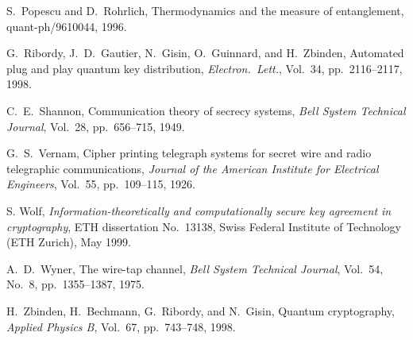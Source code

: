 \documentclass{article}
\begin{document}
\begin{thebibliography}{10}
S.~Popescu and D.\ Rohrlich, Thermodynamics and the measure of 
entanglement,  quant-ph/9610044, 1996.

 G.\ Ribordy,
J.~D.~Gautier, N.~Gisin, O.~Guinnard, and H.~Zbinden, Automated plug and play quantum 
key distribution,  {\em Electron.\ Lett.},
Vol.~34, pp.~2116--2117, 1998.

C.~E.~Shannon, Communication theory of secrecy systems,
{\em Bell System Technical Journal}, Vol.~28, pp.~656--715, 1949.

G.~S.~Vernam, Cipher printing telegraph systems for secret wire and 
radio telegraphic communications, {\em Journal of the American
Institute for Electrical Engineers}, Vol.~55, pp.~109--115, 1926.


 S. Wolf, {\em Information-theoretically and computationally
secure key agreement in cryptography}, ETH dissertation No.\ 13138, 
Swiss Federal Institute of Technology (ETH Zurich), May 1999.


A.~D.~Wyner, The wire-tap channel,
{\em Bell System Technical Journal}, Vol.~54, No.~8, pp.~1355--1387, 1975.

 H.~Zbinden, H.~Bechmann, G.~Ribordy, and N.~Gisin, Quantum cryptography, 
{\em Applied Physics B}, Vol.~67, pp.~743--748, 
1998.








\end{thebibliography}
\end{document}
